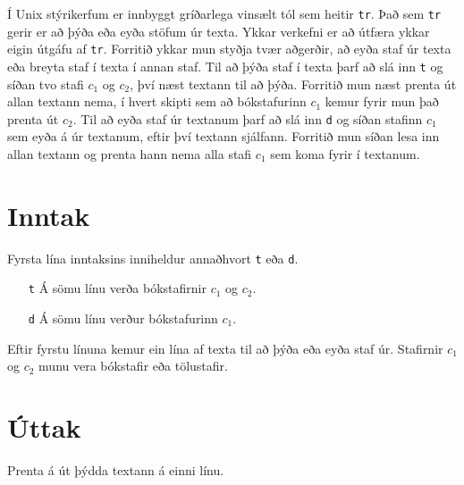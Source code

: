 
Í Unix stýrikerfum er innbyggt gríðarlega vinsælt tól sem heitir \texttt{tr}.
Það sem \texttt{tr} gerir er að þýða eða eyða stöfum úr texta. Ykkar verkefni
er að útfæra ykkar eigin útgáfu af \texttt{tr}. Forritið ykkar mun styðja tvær
aðgerðir, að eyða staf úr texta eða breyta staf í texta í annan staf.  Til að
þýða staf í texta þarf að slá inn \texttt{t} og síðan tvo stafi $c_1$ og $c_2$,
því næst textann til að þýða. Forritið mun næst prenta út allan textann nema, í
hvert skipti sem að bókstafurinn $c_1$ kemur fyrir mun það prenta út $c_2$. Til
að eyða staf úr textanum þarf að slá inn \texttt{d} og síðan stafinn $c_1$ sem
eyða á úr textanum, eftir því textann sjálfann. Forritið mun síðan lesa inn
allan textann og prenta hann nema alla stafi $c_1$ sem koma fyrir í textanum.

\section*{Inntak}
Fyrsta lína inntaksins inniheldur annaðhvort \texttt{t} eða \texttt{d}.
\begin{enumerate}
    \item[\texttt t] Á sömu línu verða bókstafirnir $c_1$ og $c_2$.
    \item[\texttt d] Á sömu línu verður bókstafurinn $c_1$.
\end{enumerate}
Eftir fyrstu línuna kemur ein lína af texta til að þýða eða eyða staf úr.
Stafirnir $c_1$ og $c_2$ munu vera bókstafir eða tölustafir.

\section*{Úttak}
Prenta á út þýdda textann á einni línu.

